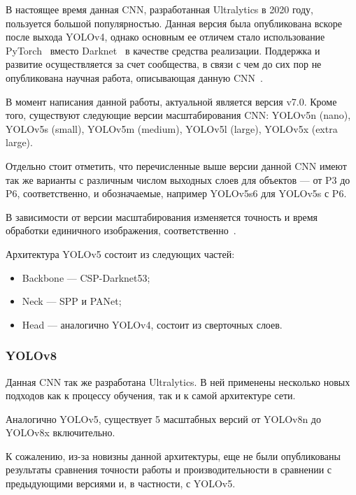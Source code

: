 В настоящее время данная CNN, разработанная Ultralytics в 2020 году, пользуется большой популярностью. Данная версия была опубликована вскоре после выхода YOLOv4, однако основным ее отличем стало использование PyTorch~\cite{pytorch} вместо Darknet~\cite{darknet} в качестве средства реализации. Поддержка и развитие осуществляется за счет сообщества, в связи с чем до сих пор не опубликована научная работа, описывающая данную CNN~\cite{yolo-review-2023}.

В момент написания данной работы, актуальной является версия v7.0. Кроме того, существуют следующие версии масштабирования CNN: YOLOv5n (nano), YOLOv5s (small), YOLOv5m (medium), YOLOv5l (large), YOLOv5x (extra large).

Отдельно стоит отметить, что перечисленные выше версии данной CNN имеют так же варианты с различным числом выходных слоев для объектов --- от P3 до P6, соответственно, и обозначаемые, например YOLOv5s6 для YOLOv5s с P6.

В зависимости от версии масштабирования изменяется точность и время обработки единичного изображения, соответственно~\cite{yolo-review-2023}.

Архитектура YOLOv5 состоит из следующих частей:
\begin{itemize}[label=---]
    \item Backbone --- CSP-Darknet53;
    \item Neck --- SPP и PANet;
    \item Head --- аналогично YOLOv4, состоит из сверточных слоев.
\end{itemize}



\subsubsection{YOLOv8}

Данная CNN так же разработана Ultralytics. В ней применены несколько новых подходов как к процессу обучения, так и к самой архитектуре сети.

Аналогично YOLOv5, существует 5 масштабных версий от YOLOv8n до YOLOv8x включительно.

К сожалению, из-за новизны данной архитектуры, еще не были опубликованы результаты сравнения точности работы и производительности в сравнении с предыдующими версиями и, в частности, с YOLOv5.

